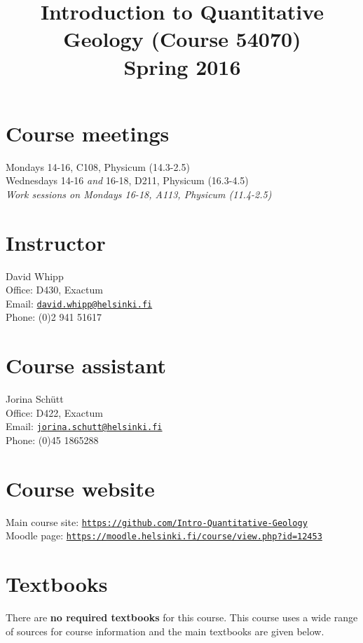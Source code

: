 \documentclass[11pt,a4paper]{article}
\begin{document}
\title{Introduction to Quantitative Geology (Course 54070)\\Spring 2016}
\author{}
\date{}
\maketitle

\section*{Course meetings}
Mondays 14-16, C108, Physicum (14.3-2.5)\\
Wednesdays 14-16 \textit{and} 16-18, D211, Physicum (16.3-4.5)\\
\textit{Work sessions on Mondays 16-18, A113, Physicum (11.4-2.5)}

\section*{Instructor}
David Whipp\\
Office: D430, Exactum\\
Email: \href{mailto:david.whipp@helsinki.fi}{\texttt{david.whipp@helsinki.fi}}\\
Phone: (0)2 941 51617

\section*{Course assistant}
Jorina Sch\"{u}tt\\
Office: D422, Exactum\\
Email: \href{mailto:jorina.schutt@helsinki.fi}{\texttt{jorina.schutt@helsinki.fi}}\\
Phone: (0)45 1865288

\section*{Course website}
Main course site: \href{https://github.com/Intro-Quantitative-Geology}{\texttt{https://github.com/Intro-Quantitative-Geology}}\\
Moodle page: \href{https://moodle.helsinki.fi/course/view.php?id=12453}{\texttt{https://moodle.helsinki.fi/course/view.php?id=12453}}

\section*{Textbooks}
There are \textbf{no required textbooks} for this course. This course uses a wide range of sources for course information and the main textbooks are given below.\\
\end{document}
